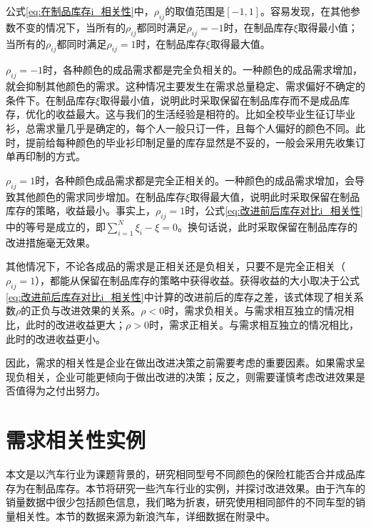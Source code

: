 公式\ref{eq:在制品库存i_相关性}中，$\rho_{ij}$的取值范围是$[-1,1]$。容易发现，在其他参数不变的情况下，当所有的$\rho_{ij}$都同时满足$\rho_{ij}=-1$时，在制品库存$\xi$取得最小值；当所有的$\rho_{ij}$都同时满足$\rho_{ij}=1$时，在制品库存$\xi$取得最大值。

$\rho_{ij}=-1$时，各种颜色的成品需求都是完全负相关的。一种颜色的成品需求增加，就会抑制其他颜色的需求。这种情况主要发生在需求总量稳定、需求偏好不确定的条件下。在制品库存$\xi$取得最小值，说明此时采取保留在制品库存而不是成品库存，优化的收益最大。这与我们的生活经验是相符的。比如全校毕业生征订毕业衫，总需求量几乎是确定的，每个人一般只订一件，且每个人偏好的颜色不同。此时，提前给每种颜色的毕业衫印制足量的库存显然是不妥的，一般会采用先收集订单再印制的方式。

$\rho_{ij}=1$时，各种颜色成品需求都是完全正相关的。一种颜色的成品需求增加，会导致其他颜色的需求同步增加。在制品库存$\xi$取得最大值，说明此时采取保留在制品库存的策略，收益最小。事实上，$\rho_{ij}=1$时，公式\ref{eq:改进前后库存对比i_相关性}中的等号是成立的，即$\sum_{i=1}^N\xi_i - \xi = 0$。换句话说，此时采取保留在制品库存的改进措施毫无效果。

其他情况下，不论各成品的需求是正相关还是负相关，只要不是完全正相关（$\rho_{ij}=1$），都能从保留在制品库存的策略中获得收益。获得收益的大小取决于公式\ref{eq:改进前后库存对比i_相关性}中计算的改进前后的库存之差，该式体现了相关系数$\rho$的正负与改进效果的关系。$\rho < 0$时，需求负相关。与需求相互独立的情况相比，此时的改进收益更大；$\rho > 0$时，需求正相关。与需求相互独立的情况相比，此时的改进收益更小。

因此，需求的相关性是企业在做出改进决策之前需要考虑的重要因素。如果需求呈现负相关，企业可能更倾向于做出改进的决策；反之，则需要谨慎考虑改进效果是否值得为之付出努力。
















\section{需求相关性实例}

本文是以汽车行业为课题背景的，研究相同型号不同颜色的保险杠能否合并成品库存为在制品库存。本节将研究一些汽车行业的实例，并探讨改进效果。由于汽车的销量数据中很少包括颜色信息，我们略为折衷，研究使用相同部件的不同车型的销量相关性。本节的数据来源为新浪汽车\cite{__????}\cite{__????-1}，详细数据在附录中。


